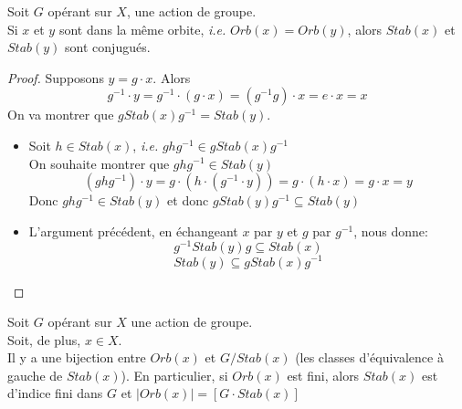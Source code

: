 \documentclass[../main.tex]{subfile}
\begin{document}
\begin{prop}
	Soit $G$ opérant sur $X$, une action de groupe.\\
	Si $x$ et $y$ sont dans la même orbite, \textit{i.e.} $Orb(x) = Orb(y)$, 
	alors $Stab(x)$ et $Stab(y)$ sont conjugués.
\end{prop}

\begin{proof}
	Supposons $y=g \cdot x$.
	Alors 
	$$g^{-1} \cdot y = g^{-1} \cdot (g \cdot x) = (g^{-1}g) \cdot x = e \cdot x = x$$
	On va montrer que $g Stab(x) g^{-1} = Stab(y)$.\\
\begin{itemize}	
	\item Soit $h \in Stab(x)$, \textit{i.e.} $ghg^{-1} \in g Stab(x) g^{-1}$\\
	On souhaite montrer que $ghg^{-1} \in Stab(y)$
	$$(ghg^{-1}) \cdot y = g \cdot (h \cdot (g^{-1} \cdot y)) = g \cdot (h \cdot x) = g \cdot x = y$$
	Donc $ghg^{-1} \in Stab(y)$ et donc $g Stab(y) g^{-1} \subseteq Stab(y)$

	\item L'argument précédent, en échangeant $x$ par $y$ et $g$ par $g^{-1}$, nous donne:\\
	$$g^{-1} Stab(y) g \subseteq Stab(x)$$
	$$Stab(y) \subseteq g Stab(x) g^{-1}$$
\end{itemize}
\end{proof}

\begin{theo}
	Soit $G$ opérant sur $X$ une action de groupe.\\
	Soit, de plus, $x \in X$.\\
	Il y a une bijection entre $Orb(x)$ et $G/Stab(x)$ (les classes d'équivalence à gauche de $Stab(x)$).
	En particulier, si $Orb(x)$ est fini, alors $Stab(x)$ est d'indice fini dans $G$ et $|Orb(x)| = [G \cdot Stab(x)]$
\end{theo}
\end{document}
